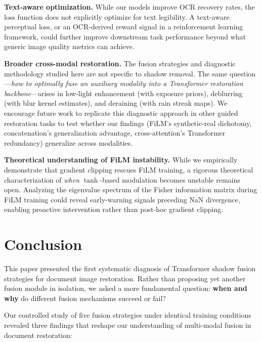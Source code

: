 \documentclass[11pt]{article}
\begin{document}
\textbf{Text-aware optimization.} While our models improve OCR recovery rates, the loss function does not explicitly optimize for text legibility.
A text-aware perceptual loss, or an OCR-derived reward signal in a reinforcement learning framework, could further improve downstream task performance beyond what generic image quality metrics can achieve.

\textbf{Broader cross-modal restoration.} The fusion strategies and diagnostic methodology studied here are not specific to shadow removal.
The same question---\textit{how to optimally fuse an auxiliary modality into a Transformer restoration backbone}---arises in low-light enhancement (with exposure priors), deblurring (with blur kernel estimates), and deraining (with rain streak maps).
We encourage future work to replicate this diagnostic approach in other guided restoration tasks to test whether our findings (FiLM's synthetic-real dichotomy, concatenation's generalization advantage, cross-attention's Transformer redundancy) generalize across modalities.

\textbf{Theoretical understanding of FiLM instability.} While we empirically demonstrate that gradient clipping rescues FiLM training, a rigorous theoretical characterization of \textit{when} $\tanh$-based modulation becomes unstable remains open.
Analyzing the eigenvalue spectrum of the Fisher information matrix during FiLM training could reveal early-warning signals preceding NaN divergence, enabling proactive intervention rather than post-hoc gradient clipping.

\section{Conclusion}

This paper presented the first systematic diagnosis of Transformer shadow fusion strategies for document image restoration.
Rather than proposing yet another fusion module in isolation, we asked a more fundamental question: \textbf{when and why} do different fusion mechanisms succeed or fail?

Our controlled study of five fusion strategies under identical training conditions revealed three findings that reshape our understanding of multi-modal fusion in document restoration:
\end{document}
